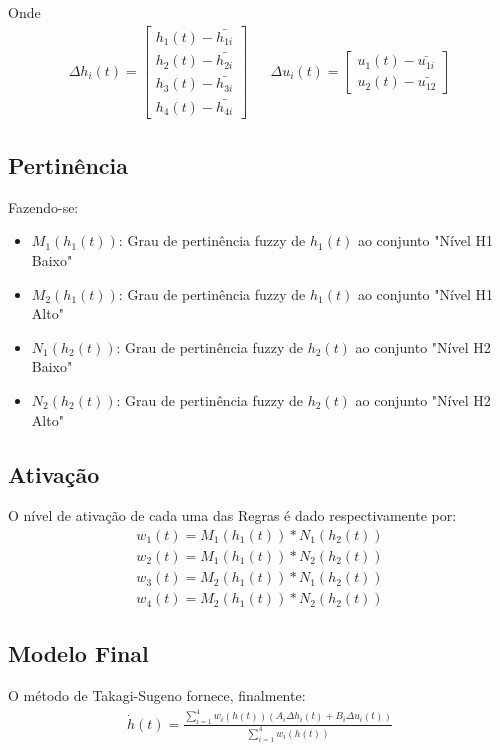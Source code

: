 	Onde
	\begin{align}
		\Delta h_i(t) =
		\begin{bmatrix}
			h_1(t) - \bar{h_{1i}} \\
			h_2(t) - \bar{h_{2i}} \\
			h_3(t) - \bar{h_{3i}} \\
			h_4(t) - \bar{h_{4i}}
		\end{bmatrix} 
		&&
		\Delta u_i(t) = 
		\begin{bmatrix}
			u_1(t) - \bar{u_{1i}} \\
			u_2(t) - \bar{u_{12}}
		\end{bmatrix}
	\end{align}	

\subsection{Pertinência}
	Fazendo-se:
	\begin{itemize}
		\centering
		\item $M_1(h_1(t))$: Grau de pertinência fuzzy de $h_1(t)$ ao conjunto "Nível H1 Baixo" 
		\item $M_2(h_1(t))$: Grau de pertinência fuzzy de $h_1(t)$ ao conjunto "Nível H1 Alto"
		\item $N_1(h_2(t))$: Grau de pertinência fuzzy de $h_2(t)$ ao conjunto "Nível H2 Baixo"
		\item $N_2(h_2(t))$: Grau de pertinência fuzzy de $h_2(t)$ ao conjunto "Nível H2 Alto"
	\end{itemize}	
	
\subsection{Ativação}
	O nível de ativação de cada uma das Regras é dado respectivamente por:
	\begin{equation}
	\begin{aligned}
		w_{1}(t) = M_1(h_1(t)) * N_1(h_2(t)) \\
		w_{2}(t) = M_1(h_1(t)) * N_2(h_2(t)) \\
		w_{3}(t) = M_2(h_1(t)) * N_1(h_2(t)) \\
		w_{4}(t) = M_2(h_1(t)) * N_2(h_2(t))
	\end{aligned}
	\label{eqGrauAtiv4T}
	\end{equation}
	
\subsection{Modelo Final}
	O método de Takagi-Sugeno fornece, finalmente:
	\begin{align}
		\dot{h}(t) = \frac{\sum_{i=1}^{4}  w_i(h(t))(A_i \Delta h_i(t) +  B_i \Delta u_i(t))}{\sum_{i=1}^{4} w_i(h(t))}
	\end{align}

